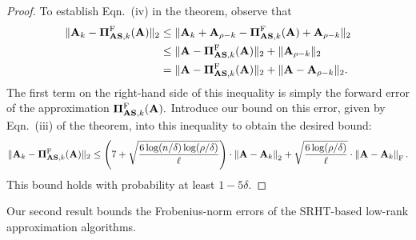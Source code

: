 \begin{proof}
To establish Eqn.~(iv) in the theorem, observe that 
\begin{align*}
 \|\mathbf{A}_k - \boldsymbol{\Pi}_{\mathbf{A}\mathbf{S}, k}^{\mathrm{F}}(\mathbf{A})\|_2 & \leq
 \|\mathbf{A}_k + \mathbf{A}_{\rho - k} 
        - \boldsymbol{\Pi}_{\mathbf{A}\mathbf{S}, k}^{\mathrm{F}}(\mathbf{A}) + \mathbf{A}_{\rho-k}\|_2 \\
  & \leq \|\mathbf{A} - \boldsymbol{\Pi}_{\mathbf{A}\mathbf{S}, k}^{\mathrm{F}}(\mathbf{A})\|_2 
      + \|\mathbf{A}_{\rho -k}\|_2 \\
  & = \|\mathbf{A} - \boldsymbol{\Pi}_{\mathbf{A}\mathbf{S}, k}^{\mathrm{F}}(\mathbf{A})\|_2 
      + \|\mathbf{A} - \mathbf{A}_{\rho -k}\|_2.
\end{align*}
The first term on the right-hand side of this inequality is simply the 
forward error of the approximation $\boldsymbol{\Pi}_{\mathbf{A}\mathbf{S}, k}^{\mathrm{F}}(\mathbf{A}).$
Introduce our bound on this error, given by Eqn.~(iii) of the theorem, into
this inequality to obtain the desired bound:
\[
 \|\mathbf{A}_k - \boldsymbol{\Pi}_{\mathbf{A}\mathbf{S}, k}^{\mathrm{F}}(\mathbf{A})\|_2 \leq \left(7 +
 \sqrt{\frac{6 \log(n/\delta)\log(\rho/\delta)}{\ell}} \right) \cdot 
   \left\|\mathbf{A} - \mathbf{A}_k\right\|_2 +
 \sqrt{\frac{6 \log(\rho/\delta)}{\ell}} \cdot \left\|\mathbf{A} - \mathbf{A}_k\right\|_\mathrm{F}.
\]
This bound holds with probability at least $1-5\delta.$
\end{proof}

Our second result bounds the Frobenius-norm errors of the SRHT-based low-rank
approximation algorithms.


